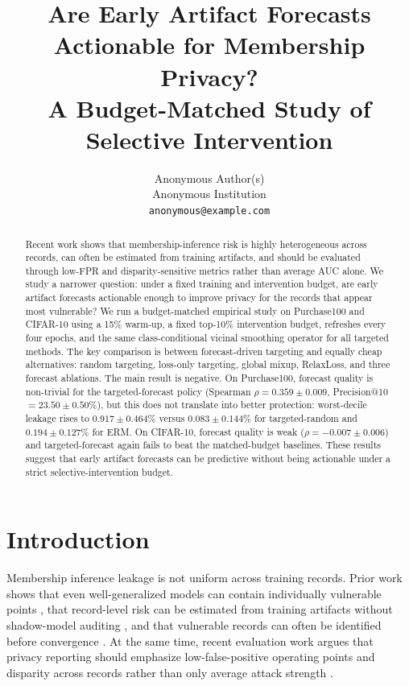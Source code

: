 \documentclass{article}
\title{Are Early Artifact Forecasts Actionable for Membership Privacy?\\A Budget-Matched Study of Selective Intervention}
\author{%
  Anonymous Author(s) \\
  Anonymous Institution \\
  \texttt{anonymous@example.com}
}
\newcommand{\purch}{Purchase100}
\newcommand{\cifar}{CIFAR-10}
\begin{document}
\maketitle

\begin{abstract}
Recent work shows that membership-inference risk is highly heterogeneous across records, can often be estimated from training artifacts, and should be evaluated through low-FPR and disparity-sensitive metrics rather than average AUC alone. We study a narrower question: under a fixed training and intervention budget, are early artifact forecasts actionable enough to improve privacy for the records that appear most vulnerable? We run a budget-matched empirical study on \purch{} and \cifar{} using a 15\% warm-up, a fixed top-10\% intervention budget, refreshes every four epochs, and the same class-conditional vicinal smoothing operator for all targeted methods. The key comparison is between forecast-driven targeting and equally cheap alternatives: random targeting, loss-only targeting, global mixup, RelaxLoss, and three forecast ablations. The main result is negative. On \purch{}, forecast quality is non-trivial for the targeted-forecast policy (Spearman $\rho=0.359\pm0.009$, Precision@10 $=23.50\pm0.50$\%), but this does not translate into better protection: worst-decile leakage rises to $0.917\pm0.464$\% versus $0.083\pm0.144$\% for targeted-random and $0.194\pm0.127$\% for ERM. On \cifar{}, forecast quality is weak ($\rho=-0.007\pm0.006$) and targeted-forecast again fails to beat the matched-budget baselines. These results suggest that early artifact forecasts can be predictive without being actionable under a strict selective-intervention budget.
\end{abstract}

\section{Introduction}

Membership inference leakage is not uniform across training records. Prior work shows that even well-generalized models can contain individually vulnerable points \citep{long2018understanding}, that record-level risk can be estimated from training artifacts without shadow-model auditing \citep{pollock2024free}, and that vulnerable records can often be identified before convergence \citep{chen2025evaluating}. At the same time, recent evaluation work argues that privacy reporting should emphasize low-false-positive operating points and disparity across records rather than only average attack strength \citep{carlini2022membership, wang2025membership}.
\end{document}
